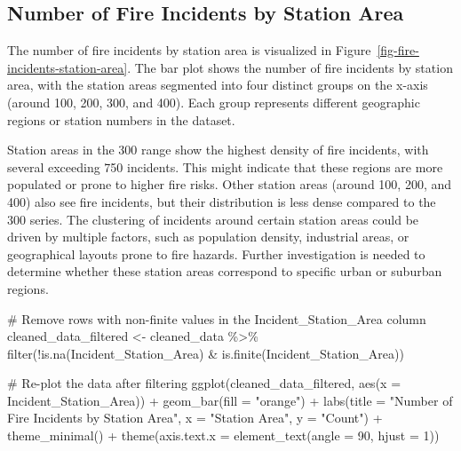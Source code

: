 \documentclass[
  letterpaper,
  DIV=11,
  numbers=noendperiod]{scrartcl}
\newenvironment{Shaded}{\begin{snugshade}}{\end{snugshade}}
\newcommand{\AttributeTok}[1]{\textcolor[rgb]{0.40,0.45,0.13}{#1}}
\newcommand{\CommentTok}[1]{\textcolor[rgb]{0.37,0.37,0.37}{#1}}
\newcommand{\DecValTok}[1]{\textcolor[rgb]{0.68,0.00,0.00}{#1}}
\newcommand{\FunctionTok}[1]{\textcolor[rgb]{0.28,0.35,0.67}{#1}}
\newcommand{\NormalTok}[1]{\textcolor[rgb]{0.00,0.23,0.31}{#1}}
\newcommand{\OtherTok}[1]{\textcolor[rgb]{0.00,0.23,0.31}{#1}}
\newcommand{\SpecialCharTok}[1]{\textcolor[rgb]{0.37,0.37,0.37}{#1}}
\newcommand{\StringTok}[1]{\textcolor[rgb]{0.13,0.47,0.30}{#1}}
\begin{document}
\hypertarget{number-of-fire-incidents-by-station-area}{%
\subsection{Number of Fire Incidents by Station
Area}\label{number-of-fire-incidents-by-station-area}}

The number of fire incidents by station area is visualized in
Figure~\ref{fig-fire-incidents-station-area}. The bar plot shows the
number of fire incidents by station area, with the station areas
segmented into four distinct groups on the x-axis (around 100, 200, 300,
and 400). Each group represents different geographic regions or station
numbers in the dataset.

Station areas in the 300 range show the highest density of fire
incidents, with several exceeding 750 incidents. This might indicate
that these regions are more populated or prone to higher fire risks.
Other station areas (around 100, 200, and 400) also see fire incidents,
but their distribution is less dense compared to the 300 series. The
clustering of incidents around certain station areas could be driven by
multiple factors, such as population density, industrial areas, or
geographical layouts prone to fire hazards. Further investigation is
needed to determine whether these station areas correspond to specific
urban or suburban regions.

\begin{Shaded}
\begin{Highlighting}[]
\CommentTok{\# Remove rows with non{-}finite values in the Incident\_Station\_Area column}
\NormalTok{cleaned\_data\_filtered }\OtherTok{\textless{}{-}}\NormalTok{ cleaned\_data }\SpecialCharTok{\%\textgreater{}\%}
  \FunctionTok{filter}\NormalTok{(}\SpecialCharTok{!}\FunctionTok{is.na}\NormalTok{(Incident\_Station\_Area) }\SpecialCharTok{\&} \FunctionTok{is.finite}\NormalTok{(Incident\_Station\_Area))}

\CommentTok{\# Re{-}plot the data after filtering}
\FunctionTok{ggplot}\NormalTok{(cleaned\_data\_filtered, }\FunctionTok{aes}\NormalTok{(}\AttributeTok{x =}\NormalTok{ Incident\_Station\_Area)) }\SpecialCharTok{+}
  \FunctionTok{geom\_bar}\NormalTok{(}\AttributeTok{fill =} \StringTok{"orange"}\NormalTok{) }\SpecialCharTok{+}
  \FunctionTok{labs}\NormalTok{(}\AttributeTok{title =} \StringTok{"Number of Fire Incidents by Station Area"}\NormalTok{, }
       \AttributeTok{x =} \StringTok{"Station Area"}\NormalTok{, }
       \AttributeTok{y =} \StringTok{"Count"}\NormalTok{) }\SpecialCharTok{+}
  \FunctionTok{theme\_minimal}\NormalTok{() }\SpecialCharTok{+}
  \FunctionTok{theme}\NormalTok{(}\AttributeTok{axis.text.x =} \FunctionTok{element\_text}\NormalTok{(}\AttributeTok{angle =} \DecValTok{90}\NormalTok{, }\AttributeTok{hjust =} \DecValTok{1}\NormalTok{))}
\end{Highlighting}
\end{Shaded}
\end{document}
